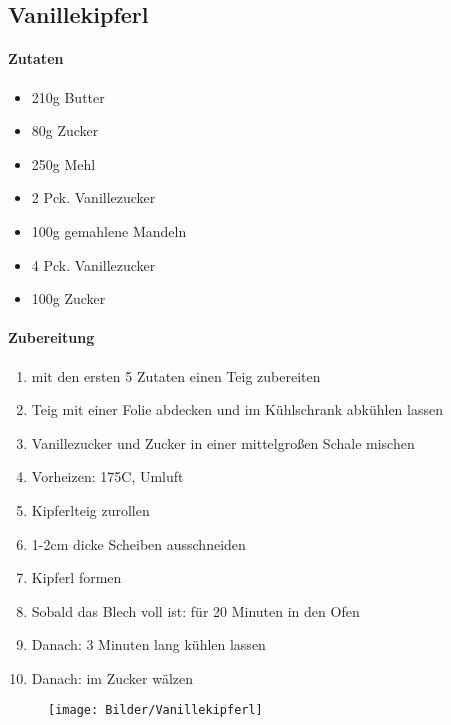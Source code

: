 \newpage
\subsection{Vanillekipferl}
\paragraph{Zutaten}
\begin{itemize}[noitemsep]
	\item 210g Butter
	\item 80g Zucker
	\item 250g Mehl
	\item 2 Pck. Vanillezucker
	\item 100g gemahlene Mandeln
	\vspace{0.5cm}
	\item 4 Pck. Vanillezucker
	\item 100g Zucker
\end{itemize}
\paragraph{Zubereitung}
\begin{enumerate}[noitemsep]
	\item mit den ersten 5 Zutaten einen Teig zubereiten
	\item Teig mit einer Folie abdecken und im Kühlschrank abkühlen lassen
	\item Vanillezucker und Zucker in einer mittelgroßen Schale mischen
	\item Vorheizen: 175\textdegree C, Umluft
	\item Kipferlteig zurollen 
	\item 1-2cm dicke Scheiben ausschneiden
	\item Kipferl formen
	\item Sobald das Blech voll ist: für 20 Minuten in den Ofen
	\item Danach: 3 Minuten lang kühlen lassen
	\item Danach: im Zucker wälzen
\end{enumerate}
\vspace{0.5cm}
\begin{figure}[h]
\centering
\texttt{[image: Bilder/Vanillekipferl]}
\end{figure}